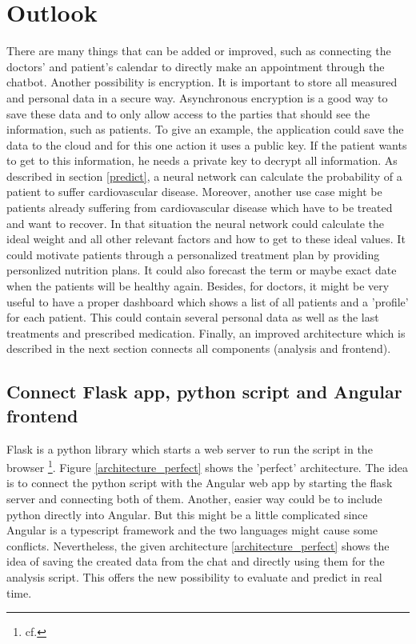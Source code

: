 \section{Outlook}

There are many things that can be added or improved, such as connecting the doctors' and patient's calendar to directly make an appointment through the chatbot. 
Another possibility is encryption. It is important to store all measured and personal data in a secure way. Asynchronous encryption is a good way to save these data and to only allow access to the parties that should see the information, such as patients. To give an example, the application could save the data to the cloud and for this one action it uses a public key. If the patient wants to get to this information, he needs a private key to decrypt all information. 
As described in section \ref{predict}, a neural network can calculate the probability of a patient to suffer cardiovascular disease.
Moreover, another use case might be patients already suffering from cardiovascular disease which have to be treated and want to recover. In that situation the neural network could calculate the ideal weight and all other relevant factors and how to get to these ideal values. It could motivate patients through a personalized treatment plan by providing personlized nutrition plans. It could also forecast the term or maybe exact date  when the patients will be healthy again.
Besides, for doctors, it might be very useful to have a proper dashboard which shows a list of all patients and a 'profile' for each patient. This could contain several personal data as well as the last treatments and prescribed medication. 
Finally, an improved architecture which is described in the next section connects all components (analysis and frontend).

\subsection{Connect Flask app, python script and Angular frontend}
Flask is a python library which starts a web server to run the script in the browser \footnote{cf.\autocite{flask}}.
Figure \ref{architecture_perfect} shows the 'perfect' architecture. The idea is to connect the python script with the Angular web app by starting the flask server and connecting both of them. Another, easier way could be to include python directly into Angular. But this might be a little complicated since Angular is a typescript framework and the two languages might cause some conflicts. 
Nevertheless, the given architecture \ref{architecture_perfect} shows the idea of saving the created data from the chat and directly using them for the analysis script. This offers the new possibility to evaluate and predict in real time.

